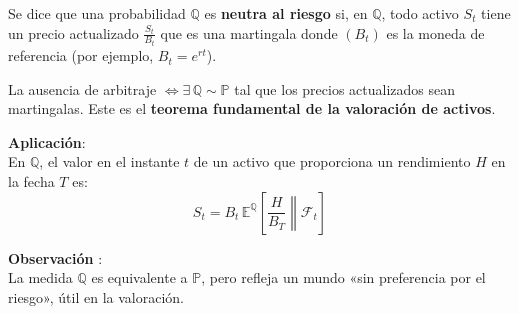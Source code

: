 \begin{f}
	
	Se dice que una probabilidad \(\mathbb{Q}\) es \textbf{neutra al riesgo} si, en \(\mathbb{Q}\), 
	todo activo \(S_t\) tiene un precio actualizado \( \frac{S_t}{B_t}\) que es una martingala
	donde \((B_t)\) es la moneda de referencia (por ejemplo, \(B_t = e^{rt}\)).
	
	La ausencia de arbitraje \(\iff \exists\, \mathbb{Q} \sim \mathbb{P}\) tal que los precios actualizados sean martingalas.
	Este es el \textbf{teorema fundamental de la valoración de activos}.
	
	\textbf{Aplicación}:\\
	En \(\mathbb{Q}\), el valor en el instante \(t\) de un activo que proporciona un rendimiento \(H\) en la fecha \(T\) es:
	\[
	S_t = B_t\, \mathbb{E}^\mathbb{Q} \left[ \left. \frac{H}{B_T} \right\|  \mathcal{F}_t \right]
	\]
	
	\textbf{Observación} :\\
	La medida \(\mathbb{Q}\) es equivalente a \(\mathbb{P}\), pero refleja un mundo «sin preferencia por el riesgo», útil en la valoración.
	
\end{f}

